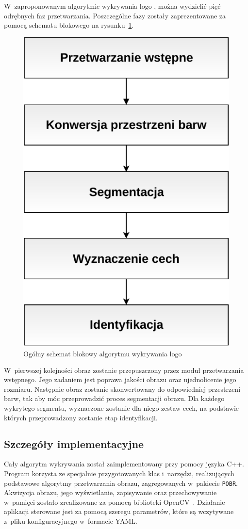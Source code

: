 W~zaproponowanym algorytmie wykrywania logo \bk, można wydzielić pięć odrębnych faz przetwarzania. Poszczególne fazy zostały zaprezentowane za pomocą schematu blokowego na rysunku~\ref{fig:algorithm-overview}.

\begin{figure}[h]
    \centering
    \includegraphics[width=0.6\columnwidth]{figures/algorithmOverview.pdf}
    \caption{Ogólny schemat blokowy algorytmu wykrywania logo \bk}
    \label{fig:algorithm-overview}
\end{figure}

W~pierwszej kolejności obraz zostanie przepuszczony przez moduł przetwarzania wstępnego. Jego zadaniem jest poprawa jakości obrazu oraz ujednolicenie jego rozmiaru.
Następnie obraz zostanie skonwertowany do odpowiedniej przestrzeni barw, tak aby móc przeprowadzić proces segmentacji obrazu. Dla każdego wykrytego segmentu, wyznaczone zostanie dla niego zestaw cech, na podstawie których przeprowadzony zostanie etap identyfikacji.

\subsection{Szczegóły implementacyjne}
Cały algorytm wykrywania został zaimplementowany przy pomocy języka C++. Program korzysta ze specjalnie przygotowanych klas i~narzędzi, realizujących podstawowe algorytmy przetwarzania obrazu, zagregowanych w~pakiecie \texttt{POBR}. Akwizycja obrazu, jego wyświetlanie, zapisywanie oraz przechowywanie w~pamięci zostało zrealizowane za pomocą biblioteki OpenCV~\cite{opencv}. Działanie aplikacji sterowane jest za pomocą szeregu parametrów, które są wczytywane z~pliku konfiguracyjnego w~formacie YAML.